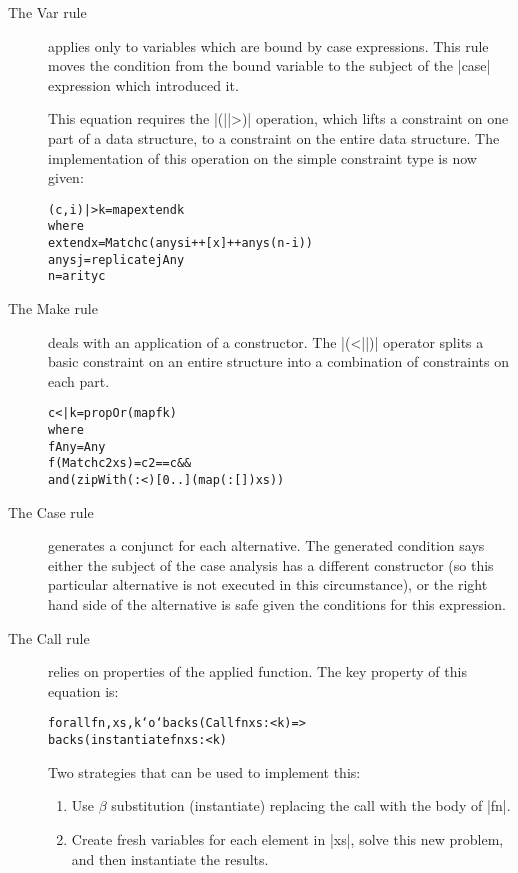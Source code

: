 \documentclass[preprint]{sigplanconf}
\newcommand{\C}[1]{\textsf{#1}}
\newenvironment{code}{\begin{alltt}\small}{\end{alltt}}
\begin{document}
\begin{description}

\item[The \C{Var} rule] applies only to variables which are bound by case expressions. This rule moves the condition from the bound variable to the subject of the |case| expression which introduced it.
    
    This equation requires the |(||>)| operation, which lifts a constraint on one part of a data structure, to a constraint on the entire data structure. The implementation of this operation on the simple constraint type is now given:

\begin{code}
(c,i) |> k = map extend k
    where
    extend x = Match c (anys i ++ [x] ++ anys (n-i))
    anys j = replicate j Any
    n = arity c
\end{code}

\item[The \C{Make} rule] deals with an application of a constructor. The |(<||)| operator splits a basic constraint on an entire structure into a combination of constraints on each part.

\begin{code}
c <| k = propOr (map f k)
    where
    f Any = Any
    f (Match c2 xs) = c2 == c &&
        and (zipWith (:<) [0..] (map (:[]) xs))
\end{code}

\item[The \C{Case} rule] generates a conjunct for each alternative. The generated condition says either the subject of the case analysis has a different constructor (so this particular alternative is not executed in this circumstance), or the right hand side of the alternative is safe given the conditions for this expression.

\item[The \C{Call} rule] relies on properties of the applied function. The key property of this equation is:
    
    \begin{code}
    forall fn, xs, k `o`  backs (Call fn xs :< k) =>
                          backs (instantiate fn xs :< k)
    \end{code}
    
    Two strategies that can be used to implement this:
    
    \begin{enumerate}
    \item Use $\beta$ substitution (\C{instantiate}) replacing the call with the body of |fn|.
    \item Create fresh variables for each element in |xs|, solve this new problem, and then instantiate the results.
    \end{enumerate}
    

\end{description}
\end{document}
